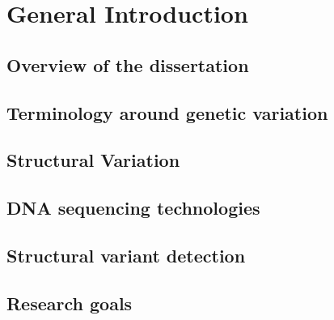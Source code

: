 \chapter{General Introduction}
\label{sec:intro}


\section{Overview of the dissertation}
\label{sec:overview}


\section{Terminology around genetic variation}
\label{sec:variation}


\section{Structural Variation}
\label{sec:sv}



\section{DNA sequencing technologies}
\label{sec:sequencing}



\section{Structural variant detection}
\label{sec:sv_detection}



\section{Research goals}
\label{sec:motivation}



